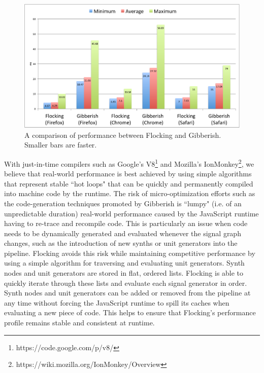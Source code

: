 \documentclass{article}
\begin{document}
\begin{figure}[ht]
\centering
\includegraphics[width=0.9\columnwidth]{images/FlockingVsGibberish20ptFont.pdf}
\caption{ A comparison of performance between Flocking and Gibberish. Smaller bars are faster. \label{fig:flockingvsgibberish}}
\end{figure}

With just-in-time compilers such as Google's V8\footnote{https://code.google.com/p/v8/} and Mozilla's IonMonkey\footnote{https://wiki.mozilla.org/IonMonkey/Overview}, we believe that real-world performance is best achieved by using simple algorithms that represent stable ``hot loops" that can be quickly and permanently  compiled into machine code by the runtime. The risk of micro-optimization efforts such as the code-generation techniques promoted by Gibberish is ``lumpy" (i.e. of an unpredictable duration) real-world performance caused by the JavaScript runtime having to re-trace and recompile code. This is particularly an issue when code needs to be dynamically generated and evaluated whenever the signal graph changes, such as the introduction of new synths or unit generators into the pipeline. Flocking avoids this risk while maintaining competitive performance by using a simple algorithm for traversing and evaluating unit generators. Synth nodes and unit generators are stored in flat, ordered lists. Flocking is able to quickly iterate through these lists and evaluate each signal generator in order. Synth nodes and unit generators can be added or removed from the pipeline at any time without forcing the JavaScript runtime to spill its caches when evaluating a new piece of code. This helps to ensure that Flocking's performance profile remains stable and consistent at runtime.
\end{document}
